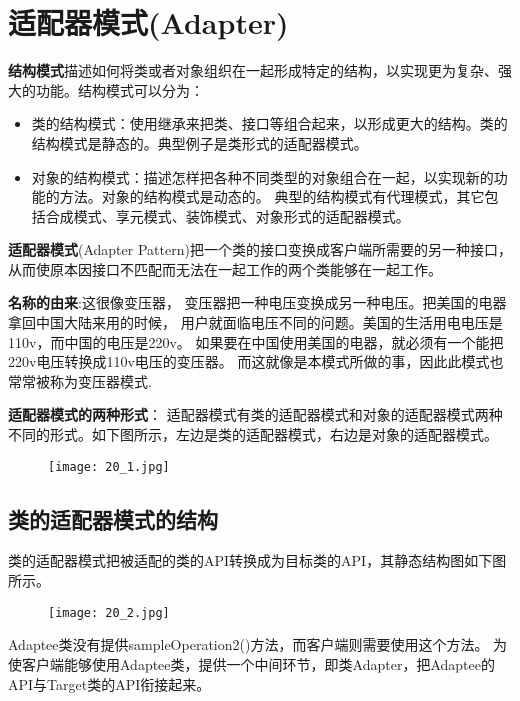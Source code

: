 \documentclass[../main.tex]{subfiles}
\begin{document}
\section{适配器模式(Adapter)}
%
\textbf{结构模式}描述如何将类或者对象组织在一起形成特定的结构，以实现更为复杂、强大的功能。结构模式可以分为：
\begin{itemize}
  \item 类的结构模式：使用继承来把类、接口等组合起来，以形成更大的结构。类的结构模式是静态的。典型例子是类形式的适配器模式。
  \item 对象的结构模式：描述怎样把各种不同类型的对象组合在一起，以实现新的功能的方法。对象的结构模式是动态的。
    典型的结构模式有代理模式，其它包括合成模式、享元模式、装饰模式、对象形式的适配器模式。
\end{itemize}
%
\textbf{适配器模式}(Adapter Pattern)把一个类的接口变换成客户端所需要的另一种接口，
从而使原本因接口不匹配而无法在一起工作的两个类能够在一起工作。

\textbf{名称的由来}:这很像变压器，
变压器把一种电压变换成另一种电压。把美国的电器拿回中国大陆来用的时候，
用户就面临电压不同的问题。美国的生活用电电压是110v，而中国的电压是220v。
如果要在中国使用美国的电器，就必须有一个能把220v电压转换成110v电压的变压器。
而这就像是本模式所做的事，因此此模式也常常被称为变压器模式.

\textbf{适配器模式的两种形式}：
适配器模式有类的适配器模式和对象的适配器模式两种不同的形式。如下图所示，左边是类的适配器模式，右边是对象的适配器模式。
\begin{figure}[H]
  \texttt{[image: 20\_1.jpg]}
\end{figure}
%
\subsection{类的适配器模式的结构}
类的适配器模式把被适配的类的API转换成为目标类的API，其静态结构图如下图所示。
%
\begin{figure}[H]
  \texttt{[image: 20\_2.jpg]}
\end{figure}
%
Adaptee类没有提供sampleOperation2()方法，而客户端则需要使用这个方法。
为使客户端能够使用Adaptee类，提供一个中间环节，即类Adapter，把Adaptee的API与Target类的API衔接起来。
\end{document}
